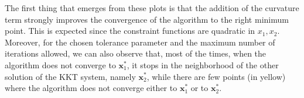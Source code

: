 \documentclass[a4paper,11pt]{article}
\begin{document}
\noindent The first thing that emerges from these plots is that the addition of the curvature term strongly improves the convergence of the algorithm to the right minimum point. This is expected since the constraint functions are quadratic in $x_{1},x_{2}$.  Moreover, for the chosen tolerance parameter and the maximum number of iterations allowed, we can also observe that, most of the times, when the algorithm does not converge to $\textbf{x}_{1}^*$, it stops in the neighborhood of the other solution of the KKT system, namely $\textbf{x}_{2}^*$, while there are few points (in yellow) where the algorithm does not converge either to $\textbf{x}_{1}^*$ or to $\textbf{x}_{2}^*$. 

%
%
%	
%
%
%
%
%
%
%	
%	
	
	
	
	
	
	
	
	
	
	
	
	
\end{document}
